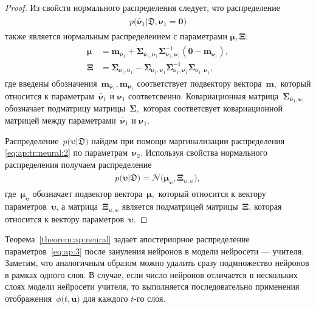 \documentclass[12pt]{a&t}
\begin{document}
\begin{proof}
Из свойств нормального распределения следует, что распределение
\begin{gather}
\label{eq:ap:tr:neural:2}
\begin{aligned}
p\bigr(\bar{\bm{\nu}}_1|\mathfrak{D}, \bm{\nu}_1=\mathbf{0}\bigr)
\end{aligned}
\end{gather}
также является нормальным распределением с параметрами $\bm{\mu}, \bm{\Xi}$:
\begin{gather}
\label{eq:ap:tr:1:1}
\begin{aligned}
\bm{\mu} &= \mathbf{m}_{\bar{\bm{\nu}}_1}+\bm{\Sigma}_{\bar{\bm{\nu}}_1,\bm{\nu}_1} \bm{\Sigma}_{\bm{\nu}_1,\bm{\nu}_1}^{-1} \left(\mathbf{0} - \mathbf{m}_{\bm{\nu}_1}\right), \\
 \bm{\Xi} &= \bm{\Sigma}_{\bar{\bm{\nu}}_1,\bar{\bm{\nu}}_1} - \bm{\Sigma}_{\bar{\bm{\nu}}_1,\bm{\nu}_1} \bm{\Sigma}_{\bm{\nu}_1,\bm{\nu}_1}^{-1} \bm{\Sigma}_{\bar{\bm{\nu}}_1,\bm{\nu}_1},
\end{aligned}
\end{gather}
где введены обозначения~$\mathbf{m}_{\bar{\bm{\nu}}_1}, \mathbf{m}_{\bm{\nu}_1}$ соответствует подвектору вектора~$\mathbf{m},$ который относится к параметрам~$\bar{\bm{\nu}}_1$ и $\bm{\nu}_1$ соответсвенно. Ковариационная матрица~$\bm{\Sigma}_{\bar{\bm{\nu}}_1,\bm{\nu}_1}$ обозначает подматрицу матрицы~$\bm{\Sigma},$ которая соответсвует ковариационной матрицей между параметрами~$\bar{\bm{\nu}}_1$ и $\bm{\nu}_1.$

Распределение~$p\bigr(\bm{\upsilon}|\mathfrak{D}\bigr)$ найдем при помощи маргинализации распределения \eqref{eq:ap:tr:neural:2} по параметрам~$\bm{\nu}_2.$ Используя свойства нормального распределения получаем распределение
\begin{gather}
\label{eq:ap:3}
\begin{aligned}
p\bigr(\bm{\upsilon}|\mathfrak{D}\bigr) = \mathcal{N}\bigr(\bm{\mu}_{\bm{\upsilon}},  \bm{\Xi}_{\bm{\upsilon}, \bm{\upsilon}}\bigr),
\end{aligned}
\end{gather}
где~$\bm{\mu}_{\bm{\upsilon}}$ обозначает подвектор вектора~$\bm{\mu},$ который относится к вектору параметров~$\bm{\upsilon}$, а матрица~$\bm{\Xi}_{\bm{\upsilon}, \bm{\upsilon}}$ является подматрицей матрицы~$\bm{\Xi}$, которая относится к вектору параметров~$\bm{\upsilon}.$
\end{proof}

Теорема~\ref{theorem:ap:neural} задает апостериорное распределение параметров~\eqref{eq:ap:3} после зануления нейронов в модели нейросети --- учителя. Заметим, что аналогичным образом можно удалить сразу подмножество нейронов в рамках одного слоя. В случае, если число нейронов отличается в нескольких слоях модели нейросети учителя, то выполняется последовательно применения отображения~$\phi\bigr(t, \mathbf{u}\bigr)$ для каждого $t$-го слоя.
\end{document}
